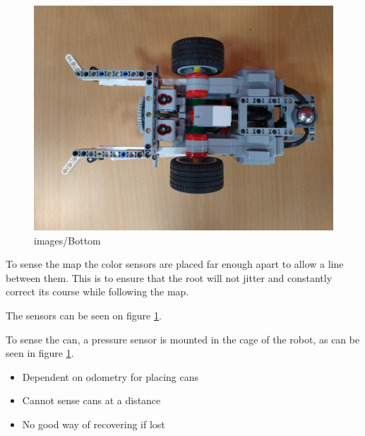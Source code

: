 \documentclass[../../main.tex]{subfiles}
\begin{document}
\begin{figure}[h]
	\centering
	\includegraphics[width=0.8\linewidth]{images/bottom.jpg}
	\caption{images/Bottom}%
	\label{fig:images/bottom}
\end{figure}

To sense the map the color sensors are placed far enough apart to allow a line between them.
This is to ensure that the root will not jitter and constantly correct its course while
following the map.

The sensors can be seen on figure \ref{fig:images/bottom}.


To sense the can, a pressure sensor is mounted in the cage of the robot, as can be seen in figure
\ref{fig:images/bottom}.


\begin{itemize}
	\item Dependent on odometry for placing cans
	\item Cannot sense cans at a distance
	\item No good way of recovering if lost
\end{itemize}

	
\end{document}
